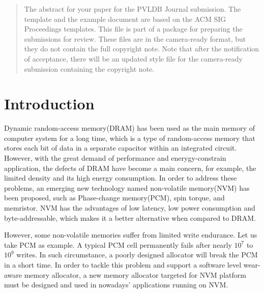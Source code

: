 \documentclass{vldb}
\begin{document}
\maketitle

\begin{abstract}
The abstract for your paper for the PVLDB Journal submission.
The template and the example document are based on the ACM SIG Proceedings  templates. This file is part of a package for preparing the submissions for review. These files are in the camera-ready format, but they do not contain the full copyright note.
Note that after the notification of acceptance, there will be an updated style file for the camera-ready submission containing the copyright note.
\end{abstract}



\section{Introduction}

Dynamic random-access memory(DRAM) has been used as the main memory of computer system for a long time, which is a type of random-access memory that stores each bit of data in a separate capacitor within an integrated circuit. 
However, with the great demand of performance and enerygy-constrain application, the defects of DRAM have become a main concern,
for example, the limited density and its high energy consumption. 
In order to address these problems, an emerging new technology named non-volatile memory(NVM) has been proposed, such as Phase-change memory(PCM), spin torque, and memristor. 
NVM has the advantages of low latency, low power consumption and byte-addressable, which makes it a better alternative when compared  to DRAM.

However, some non-volatile memories suffer from limited write endurance. 
Let us take PCM as example. A typical PCM cell permanently fails after nearly $10^7$ to $10^9$ writes. 
In such circumstance, a poorly designed allocator will break the PCM in a short time. 
In order to tackle this problem and support a software level wear-aware memory allocator, a new memory allocator targeted for NVM platform must be designed and used in nowadays’ applications running on NVM.
\end{document}
